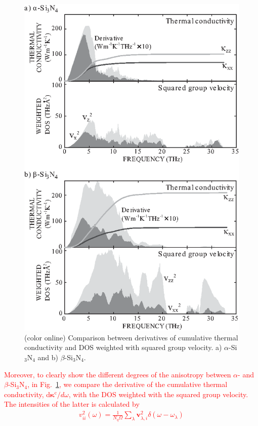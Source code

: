 \documentclass[twocolumn,amsmath,amssymb,a4paper,prb,superscriptaddress,floatfix]{revtex4-1}
\begin{document}
\begin{figure}[ht]
 \begin{center}
  \includegraphics[width=1.00\linewidth]{Fig7.eps} \caption{(color
  online) Comparison between derivatives of cumulative thermal
  conductivity and DOS weighted with squared group velocity. a)
  $\alpha$-Si$_3$N$_4$ and b) $\beta$-Si$_3$N$_4$.  \label{fig:Fig7} }
 \end{center}
\end{figure}

\textcolor{red}{Moreover, to clearly show the different degrees of the
anisotropy between $\alpha$- and $\beta$-Si$_3$N$_4$, in 
Fig.~\ref{fig:Fig7}, we compare
the derivative of the cumulative thermal conductivity,
d$\boldsymbol{\kappa}^\text{c}/d\omega$, with the DOS weighted with the
squared group velocity. The intensities of the latter is calculated by
\begin{align}
 v_{ii}^2(\omega) = \frac{1}{N_q\Omega}\sum_\lambda
 \mathbf{v}_{\lambda,i}^2 \delta(\omega - \omega_\lambda)
\end{align}
}
\end{document}
